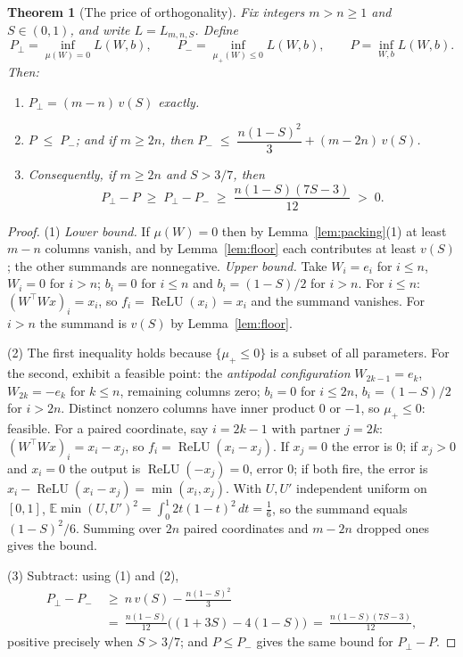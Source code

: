 \documentclass[11pt]{amsart}
\theoremstyle{plain}
\newtheorem{theorem}{Theorem}[section]
\theoremstyle{definition}
\DeclareMathOperator{\relu}{ReLU}
\newcommand{\E}{\mathbb{E}}
\begin{document}
\begin{theorem}[The price of orthogonality]\label{thm:price}
Fix integers $m>n\ge 1$ and $S\in(0,1)$, and write $L=L_{m,n,S}$. Define
\[
P_\perp = \inf_{\mu(W)=0} L(W,b), \qquad
P_- = \inf_{\mu_+(W)\le 0} L(W,b), \qquad
P = \inf_{W,b} L(W,b).
\]
Then:
\begin{enumerate}
\item $P_\perp = (m-n)\,v(S)$ exactly.
\item $P \;\le\; P_-$; and if $m\ge 2n$, then $P_- \;\le\; \dfrac{n(1-S)^2}{3}+(m-2n)\,v(S)$.
\item Consequently, if $m\ge 2n$ and $S>3/7$, then
\[
P_\perp - P \;\ge\; P_\perp - P_- \;\ge\; \frac{n(1-S)(7S-3)}{12} \;>\;0 .
\]
\end{enumerate}
\end{theorem}

\begin{proof}
(1) \emph{Lower bound.} If $\mu(W)=0$ then by Lemma~\ref{lem:packing}(1) at least $m-n$ columns vanish, and by Lemma~\ref{lem:floor} each contributes at least $v(S)$; the other summands are nonnegative. \emph{Upper bound.} Take $W_i=e_i$ for $i\le n$, $W_i=0$ for $i>n$; $b_i=0$ for $i\le n$ and $b_i = (1-S)/2$ for $i>n$. For $i\le n$: $(W^{\top}Wx)_i=x_i$, so $f_i=\relu(x_i)=x_i$ and the summand vanishes. For $i>n$ the summand is $v(S)$ by Lemma~\ref{lem:floor}.

(2) The first inequality holds because $\{\mu_+\le0\}$ is a subset of all parameters. For the second, exhibit a feasible point: the \emph{antipodal configuration} $W_{2k-1}=e_k$, $W_{2k}=-e_k$ for $k\le n$, remaining columns zero; $b_i=0$ for $i\le 2n$, $b_i=(1-S)/2$ for $i>2n$. Distinct nonzero columns have inner product $0$ or $-1$, so $\mu_+\le0$: feasible. For a paired coordinate, say $i=2k-1$ with partner $j=2k$: $(W^{\top}Wx)_i = x_i-x_j$, so $f_i=\relu(x_i-x_j)$. If $x_j=0$ the error is $0$; if $x_j>0$ and $x_i=0$ the output is $\relu(-x_j)=0$, error $0$; if both fire, the error is $x_i-\relu(x_i-x_j)=\min(x_i,x_j)$. With $U,U'$ independent uniform on $[0,1]$, $\E\min(U,U')^2=\int_0^1 2t(1-t)^2\,dt=\tfrac16$, so the summand equals $(1-S)^2/6$. Summing over $2n$ paired coordinates and $m-2n$ dropped ones gives the bound.

(3) Subtract: using (1) and (2),
\begin{align*}
P_\perp - P_- \ &\ge\ n\,v(S) - \frac{n(1-S)^2}{3} \\
&=\ \frac{n(1-S)}{12}\bigl((1+3S) - 4(1-S)\bigr) \ =\ \frac{n(1-S)(7S-3)}{12},
\end{align*}
positive precisely when $S>3/7$; and $P\le P_-$ gives the same bound for $P_\perp-P$.
\end{proof}
\end{document}
